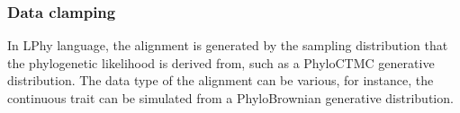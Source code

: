 \documentclass[10pt,letterpaper,table]{article}
\begin{document}
{%









\subsubsection{Data clamping} 
In LPhy language, the alignment is generated by the sampling distribution that the phylogenetic likelihood is derived from, such as a PhyloCTMC generative distribution. The data type of the alignment can be various, for instance, the continuous trait can be simulated from a PhyloBrownian generative distribution. 

}
\end{document}
